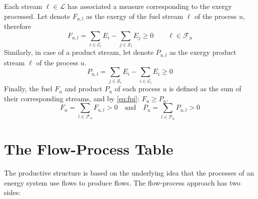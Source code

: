 \documentclass{ecos2018}
\begin{document}
Each stream $\ell \in \mathcal{L}$ has associated a measure corresponding to the exergy processed. Let denote $F_{u,l}$ as the exergy of the fuel stream $\ell$ of the process $u$, therefore
\begin{equation}
F_{u,l} = \sum_{i\in\mathcal{E}_l} E_i - \sum_{j\in\mathcal{S}_l} E_j \ge 0 \qquad \ell\in\mathcal{F}_u
\label{eq:fs}
\end{equation}
\label{eq2_3}
Similarly, in case of a product stream, let denote  $P_{u,l}$ as the exergy  product stream $\ell$ of the process $u$.
\begin{equation}
P_{u,l}=\sum_{j\in\mathcal{S}_l} E_i - \sum_{i\in\mathcal{E}_l} E_i \ge 0
\label{eq:ps}
\end{equation}
Finally, the fuel $F_u$ and product $P_u$ of each process $u$ is defined as the sum of their corresponding streams, and by \cref{eq:fpi}: $F_u \ge P_u$. 
\begin{equation}
F_u=\sum_{l\in\mathcal{F}_u} F_{u,l} > 0 \quad\text{and} \quad P_u=\sum_{l\in\mathcal{P}_u} P_{u,l} > 0
\end{equation}

\section{The Flow-Process Table}
The productive structure is based on the underlying idea that the processes of an energy system use flows to produce flows. The flow-process approach has two sides:
\end{document}
